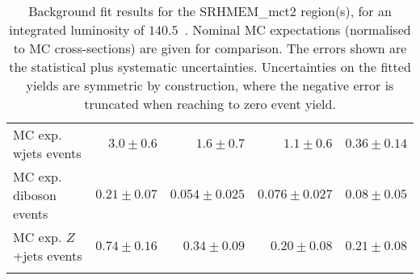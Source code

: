\begin{table}
\begin{center}
{\begin{tabular*}{\textwidth}{@{\extracolsep{\fill}}lrrrr}
        MC exp. wjets events         & $3.0 \pm 0.6$          & $1.6 \pm 0.7$          & $1.1 \pm 0.6$          & $0.36 \pm 0.14$              \\
        MC exp. diboson events         & $0.21 \pm 0.07$          & $0.054 \pm 0.025$          & $0.076 \pm 0.027$          & $0.08 \pm 0.05$              \\
        MC exp. $Z$+jets events         & $0.74 \pm 0.16$          & $0.34 \pm 0.09$          & $0.20 \pm 0.08$          & $0.21 \pm 0.08$              \\
\noalign{\smallskip}\hline\noalign{\smallskip}
\end{tabular*}
}
\end{center}
\caption{ Background fit results for the SRHMEM\_mct2 region(s),  for an integrated luminosity of $140.5$~\ifb.
Nominal MC expectations (normalised to MC cross-sections) are given for comparison. 
The errors shown are the statistical plus systematic uncertainties.
Uncertainties on the fitted yields are symmetric by construction, 
where the negative error is truncated when reaching to zero event yield.
}
\label{table.results.yields.fit.SRHMEM}
\end{table}
%